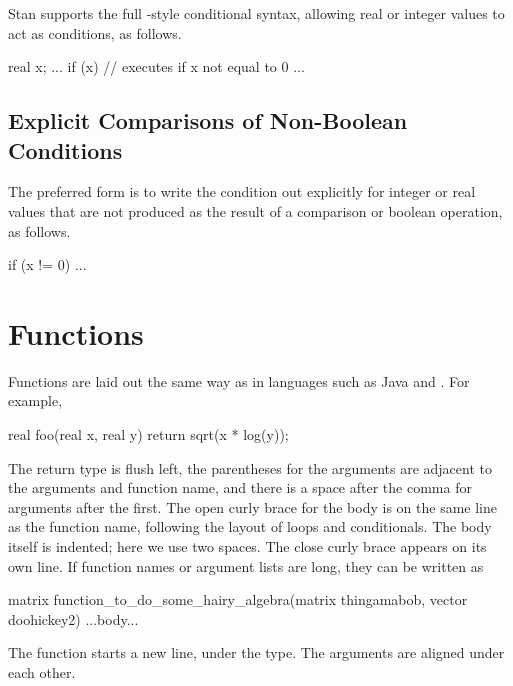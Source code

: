 Stan supports the full \Cpp-style conditional syntax,
allowing real or integer values to act as conditions, as follows.
%
\begin{stancode}
real x;
...
if (x) {
   // executes if x not equal to 0
   ...
}
\end{stancode}
%

\subsection{Explicit Comparisons of Non-Boolean Conditions}

The preferred form is to write the condition out explicitly for
integer or real values that are not produced as the result of a
comparison or boolean operation, as follows.
%
\begin{stancode}
if (x != 0) ...
\end{stancode}



\section{Functions}

Functions are laid out the same way as in languages such as Java and
\Cpp.  For example,
%
\begin{stancode}
real foo(real x, real y) {
  return sqrt(x * log(y));
}
\end{stancode}
%
The return type is flush left, the parentheses for the arguments are
adjacent to the arguments and function name, and there is a space
after the comma for arguments after the first.  The open curly brace
for the body is on the same line as the function name, following the
layout of loops and conditionals.  The body itself is indented; here
we use two spaces.  The close curly brace appears on its own line.
%
If function names or argument lists are long, they can be
written as
%
\begin{stancode}
matrix
function_to_do_some_hairy_algebra(matrix thingamabob,
                                  vector doohickey2) {
  ...body...
}
\end{stancode}
%
The function starts a new line, under the type.  The arguments are
aligned under each other.

